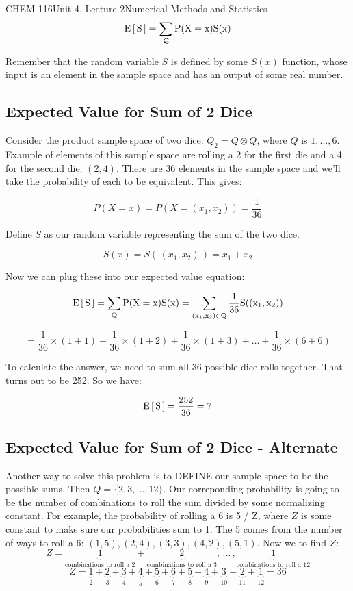 \documentclass{article}
\begin{document}
\begin{tdoc}{CHEM 116}{Unit 4, Lecture 2}{Numerical Methods and Statistics}
\begin{equation}
\rm{E}\left[\,S\,\right] = \sum_\mathcal{Q} P(X=x)S(x)
\end{equation}

Remember that the random variable $S$ is defined by some $S(x)$
function, whose input is an element in the sample space and has an
output of some real number.


\subsection{Expected Value for Sum of 2 Dice}

Consider the product sample space of two dice: $Q_2 = Q \otimes Q$,
where $Q$ is $1,\ldots,6$. Example of elements of this sample space
are rolling a 2 for the first die and a 4 for the second die: $(2,
4)$. There are 36 elements in the sample space and we'll take the
probability of each to be equivalent. This gives:

\[
P(X = x) = P(X = (x_1, x_2)) = \frac{1}{36}
\]

Define $S$ as our random variable representing the sum of the two dice.

\[
S(x) = S(\, (x_1, x_2)\, ) = x_1 + x_2
\]

Now we can plug these into our expected value equation:

\[
\rm{E}\left[\,S\,\right] = \sum_{Q} P(X=x)S(x) = \sum_{(x_1,x_2) \in Q} \frac{1}{36} S( (x_1, x_2) )
\]

\[
= \frac{1}{36}\times (1 + 1) + \frac{1}{36} \times (1 + 2) + \frac{1}{36} \times (1 + 3) + \ldots + \frac{1}{36} \times (6 + 6)
\]

To calculate the answer, we need to sum all 36 possible dice rolls
together. That turns out to be 252. So we have:

\[
\rm{E}\left[\,S\,\right] = \frac{252}{36} = 7
\]

\subsection{Expected Value for Sum of 2 Dice - Alternate}

Another way to solve this problem is to DEFINE our sample space to be
the possible sums. Then $Q = \{2, 3, \ldots, 12\}$. Our correponding
probability is going to be the number of combinations to roll the sum
divided by some normalizing constant. For example, the probability of
rolling a 6 is 5 / Z, where $Z$ is some constant to make sure our
probabilities sum to 1. The 5 comes from the number of ways to roll a
6: $(1, 5), (2, 4), (3, 3), (4, 2), (5, 1)$. Now we to find $Z$:
\[
Z = \underbrace{1}_{\textrm{combinations to roll a 2}} + \underbrace{2}_{\textrm{combinations to roll a 3}},\, \ldots\,, \underbrace{1}_{\textrm{combinations to roll a 12}}
\]
\[
Z = \underbrace{1}_2 + \underbrace{2}_3 + \underbrace{3}_4 + \underbrace{4}_5 + \underbrace{5}_6 + \underbrace{6}_7 + \underbrace{5}_8 + \underbrace{4}_9 + \underbrace{3}_{10} + \underbrace{2}_{11} + \underbrace{1}_{12} = 36
\]


\end{tdoc}
\end{document}
